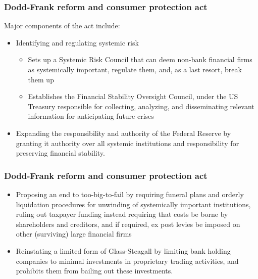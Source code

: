 \documentclass[11pt]{beamer}
\begin{document}
\begin{frame}
\frametitle{Dodd-Frank reform and consumer protection act}
Major components of the act include:
\begin{itemize}
\item Identifying and regulating systemic risk
\begin{itemize}
\item Sets up a Systemic Risk Council that can deem non-bank financial firms as systemically important, regulate them, and, as a last resort, break them up
\item Establishes the Financial Stability Oversight Council, under the US Treasury responsible for collecting, analyzing, and disseminating relevant information for anticipating future crises
\end{itemize}
\item Expanding the responsibility and authority of the Federal Reserve by granting it authority over all systemic institutions and responsibility for preserving financial stability.
%
\end{itemize}
\end{frame}


\begin{frame}
\frametitle{Dodd-Frank reform and consumer protection act}
\begin{itemize}
\item Proposing an end to too-big-to-fail by requiring funeral plans and orderly liquidation procedures for unwinding of systemically important institutions, ruling out taxpayer funding instead requiring that costs be borne by shareholders and creditors, and if required, ex post levies be imposed on other (surviving) large financial firms
\item Reinstating a limited form of Glass-Steagall by limiting bank holding companies to minimal investments in proprietary trading activities, and prohibits them from bailing out these investments.
\end{itemize}
\end{frame}
\end{document}
